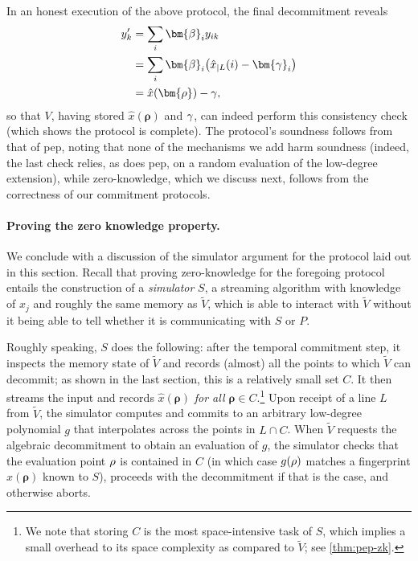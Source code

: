 \documentclass[10pt,a4paper]{article}
\newif\iflipics\lipicsfalse
\theoremstyle{definition}
\newcommand{\pepprotocol}{\textsf{pep}\xspace}
\newcommand{\pcommitstring}{y}
\newcommand{\evaluationpoint}{\bm{\fe2}}
\newcommand{\fingerprinttuple}{\bm{\rho}}
\renewcommand{\line}{L}
\def\fe#1{
    \ifnum#1=1
        \alpha
    \else
    \ifnum#1=2
        \beta
    \else
    \ifnum#1=3
        \gamma
    \fi\fi\fi
}
\def\rfe#1{
    \ifnum#1=1
        \rho
    \else
    \ifnum#1=2
        \sigma
    \else
    \fi\fi
}
\begin{document}
    \iflipics\else\paragraph*{}\fi In an honest execution of the above protocol, the final decommitment reveals
    \begin{align*}
        \pcommitstring'_k &= \sum_i \evaluationpoint_i y_{ik}\\
        &= \sum_i \evaluationpoint_i \big(\hat x_{|\line}(i) - \bm{\fe3}_i\big)\\
        &= \hat x(\fingerprinttuple) - \fe3,
    \end{align*}
    so that $V$, having stored $\hat x(\fingerprinttuple)$ and $\fe3$, can indeed perform this consistency check (which shows the protocol is complete). The protocol's soundness follows from that of \pepprotocol, noting that none of the mechanisms we add harm soundness (indeed, the last check relies, as does \pepprotocol, on a random evaluation of the low-degree extension), while zero-knowledge, which we discuss next, follows from the correctness of our commitment protocols.    
    
    \paragraph*{Proving the zero knowledge property\iflipics\else.\fi}
    We conclude with a discussion of the simulator argument for the protocol laid out in this section. Recall that proving zero-knowledge for the foregoing protocol entails the construction of a \emph{simulator} $S$, a streaming algorithm with knowledge of $x_j$ and roughly the same memory as $\widetilde V$, which is able to interact with $\widetilde V$ without it being able to tell whether it is communicating with $S$ or $P$.
    
    Roughly speaking, $S$ does the following: after the temporal commitment step, it inspects the memory state of $\widetilde V$ and records (almost) all the points to which $\widetilde V$ can decommit; as shown in the last section, this is a relatively small set $C$. It then streams the input and records $\hat x(\fingerprinttuple)$ \emph{for all $\fingerprinttuple \in C$}.\footnote{We note that storing $C$ is the most space-intensive task of $S$, which implies a small overhead to its space complexity as compared to $\widetilde V$; see \cref{thm:pep-zk}.} Upon receipt of a line $\line$ from $\widetilde V$, the simulator computes and commits to an arbitrary low-degree polynomial $g$ that interpolates across the points in $\line \cap C$. When $\widetilde V$ requests the algebraic decommitment to obtain an evaluation of $g$, the simulator checks that the evaluation point $\rfe1$ is contained in $C$ (in which case $g(\rfe1)$ matches a fingerprint $\hat x(\fingerprinttuple)$ known to $S$), proceeds with the decommitment if that is the case, and otherwise aborts.
    
\end{document}
